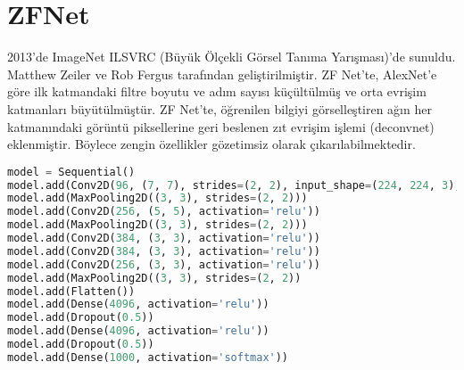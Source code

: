 \section{ZFNet}
2013'de ImageNet ILSVRC (Büyük Ölçekli Görsel Tanıma Yarışması)'de sunuldu. Matthew Zeiler ve Rob Fergus tarafından geliştirilmiştir. ZF Net'te, AlexNet'e göre ilk katmandaki filtre boyutu ve adım sayısı küçültülmüş ve orta evrişim katmanları büyütülmüştür. ZF Net'te, öğrenilen bilgiyi görselleştiren ağın her katmanındaki görüntü piksellerine geri beslenen zıt evrişim işlemi (deconvnet) eklenmiştir. Böylece zengin özellikler gözetimsiz olarak çıkarılabilmektedir.

\begin{lstlisting}[language=Python]
model = Sequential()
model.add(Conv2D(96, (7, 7), strides=(2, 2), input_shape=(224, 224, 3), activation='relu'))
model.add(MaxPooling2D((3, 3), strides=(2, 2)))
model.add(Conv2D(256, (5, 5), activation='relu'))
model.add(MaxPooling2D((3, 3), strides=(2, 2)))
model.add(Conv2D(384, (3, 3), activation='relu'))
model.add(Conv2D(384, (3, 3), activation='relu'))
model.add(Conv2D(256, (3, 3), activation='relu'))
model.add(MaxPooling2D((3, 3), strides=(2, 2))
model.add(Flatten())
model.add(Dense(4096, activation='relu'))
model.add(Dropout(0.5))
model.add(Dense(4096, activation='relu'))
model.add(Dropout(0.5))
model.add(Dense(1000, activation='softmax'))
\end{lstlisting}

\newpage